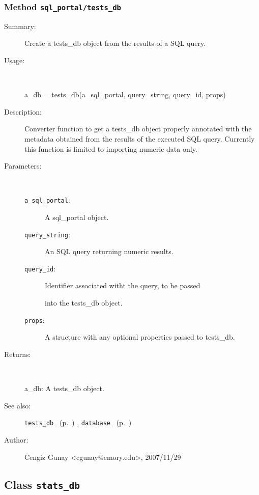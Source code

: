 \subsubsection[Method \texttt{tests\_db}]{Method \texttt{sql\_portal/tests\_db}}%
%
\label{ref_sql_portal__tests_db}%
\hypertarget{ref_sql_portal__tests_db}{}%
\begin{description}
\item[Summary:]Create a tests\_db object from the results of a SQL query.
%
\item[Usage:]~%
\begin{lyxcode}%
a\_db = tests\_db(a\_sql\_portal, query\_string, query\_id, props)
%
\end{lyxcode}%
%
\item[Description:]%
Converter function to get a tests\_db object properly annotated with
 the metadata obtained from the results of the executed SQL
 query. Currently this function is limited to importing numeric data only.
\item[Parameters:]~
\begin{description}%
\item[\texttt{a\_sql\_portal}:]
 A sql\_portal object.
\item[\texttt{query\_string}:]
 An SQL query returning numeric results.
\item[\texttt{query\_id}:]
 Identifier associated witht the query, to be passed

into the tests\_db object.
\item[\texttt{props}:]
 A structure with any optional properties passed to tests\_db.
\end{description}%
%
\item[Returns:
]~

	a\_db: A tests\_db object.
%
%
\item[See also:]%
\hyperlink{ref_tests_db}{\texttt{tests\_db}}%
\ (p.~\pageref{ref_tests_db})%
%
, \hyperlink{ref_database}{\texttt{database}}%
\ (p.~\pageref{ref_database})%
%
%
\item[Author:]%
Cengiz Gunay <cgunay@emory.edu>, 2007/11/29
%
\end{description}
\methodline%
\subsection{Class \texttt{stats\_db}}%
%
\label{ref_stats_db}%
\hypertarget{ref_stats_db}{}%
